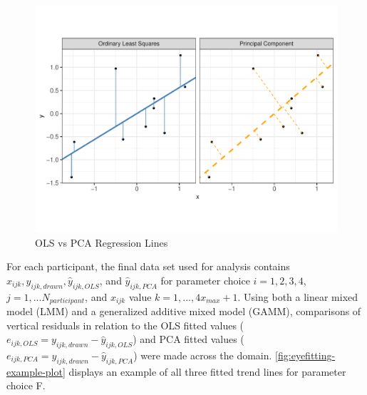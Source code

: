 \documentclass[print]{nuthesis}
\begin{document}
\begin{figure}[tbp]

{\centering \includegraphics[width=1\linewidth,]{thesis_files/figure-latex/ols-vs-pca-example-1} 

}

\caption{OLS vs PCA Regression Lines}\label{fig:ols-vs-pca-example}
\end{figure}

For each participant, the final data set used for analysis contains \(x_{ijk}, y_{ijk,drawn}, \hat y_{ijk,OLS}\), and \(\hat y_{ijk,PCA}\) for parameter choice \(i = 1,2,3,4\), \(j = 1,...N_{participant}\), and \(x_{ijk}\) value \(k = 1, ...,4 x_{max} + 1\).
Using both a linear mixed model (LMM) and a generalized additive mixed model (GAMM), comparisons of vertical residuals in relation to the OLS fitted values (\(e_{ijk,OLS} = y_{ijk,drawn} - \hat y_{ijk,OLS}\)) and PCA fitted values (\(e_{ijk,PCA} = y_{ijk,drawn} - \hat y_{ijk,PCA}\)) were made across the domain.
\cref{fig:eyefitting-example-plot} displays an example of all three fitted trend lines for parameter choice F.
\end{document}

